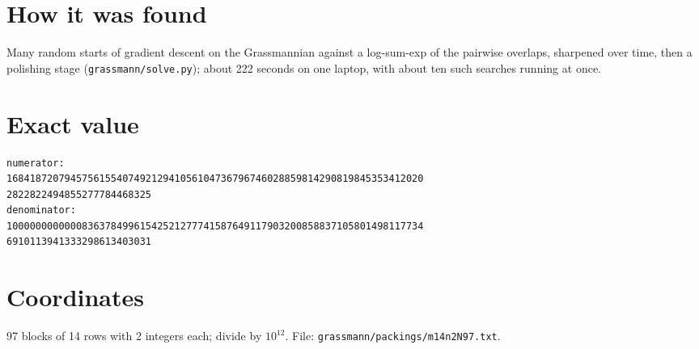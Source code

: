 \documentclass[11pt,a4paper]{article}
\begin{document}
\section{How it was found}
Many random starts of gradient descent on the Grassmannian against a log-sum-exp of the pairwise overlaps, sharpened over time, then a polishing stage (\texttt{grassmann/solve.py}); about 222 seconds on one laptop, with about ten such searches running at once.


\appendix
\section{Exact value}
{\small
\begin{verbatim}
numerator:
168418720794575615540749212941056104736796746028859814290819845353412020
2822822494855277784468325
denominator:
100000000000083637849961542521277741587649117903200858837105801498117734
6910113941333298613403031
\end{verbatim}}

\section{Coordinates}
97 blocks of 14 rows with 2 integers each; divide by $10^{12}$. File: \texttt{grassmann/packings/m14n2N97.txt}.
{\tiny
\begin{multicols}{4}
\end{multicols}}
\end{document}
